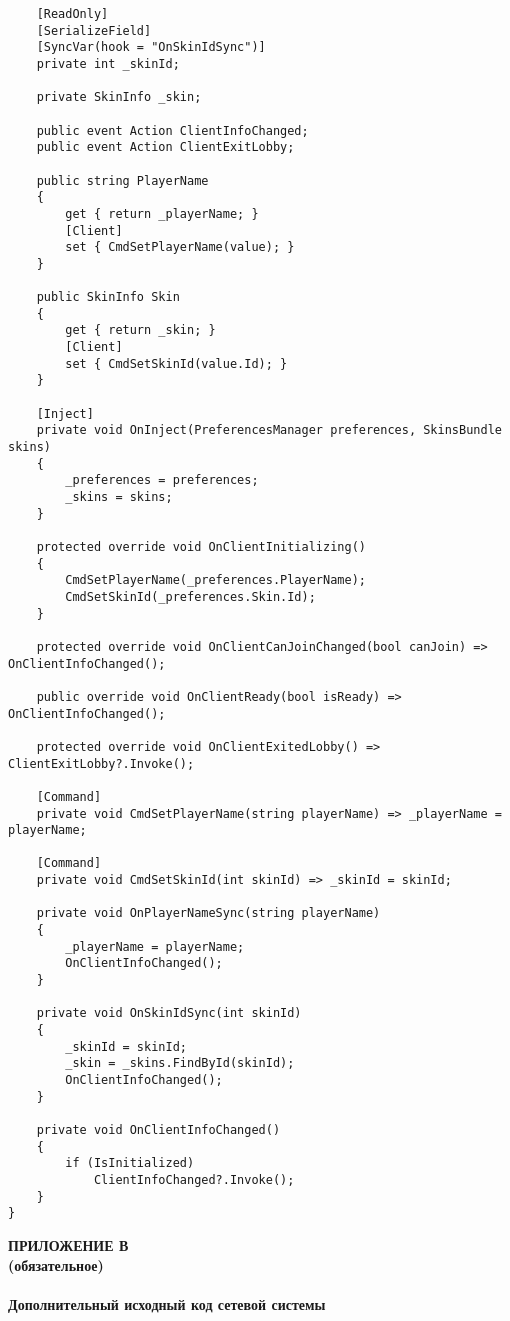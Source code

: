 \begin{lstlisting}
    [ReadOnly]
    [SerializeField]
    [SyncVar(hook = "OnSkinIdSync")]
    private int _skinId;

    private SkinInfo _skin;

    public event Action ClientInfoChanged;
    public event Action ClientExitLobby;

    public string PlayerName
    {
        get { return _playerName; }
        [Client]
        set { CmdSetPlayerName(value); }
    }

    public SkinInfo Skin
    {
        get { return _skin; }
        [Client]
        set { CmdSetSkinId(value.Id); }
    }

    [Inject]
    private void OnInject(PreferencesManager preferences, SkinsBundle skins)
    {
        _preferences = preferences;
        _skins = skins;
    }

    protected override void OnClientInitializing()
    {
        CmdSetPlayerName(_preferences.PlayerName);
        CmdSetSkinId(_preferences.Skin.Id);
    }

    protected override void OnClientCanJoinChanged(bool canJoin) => OnClientInfoChanged();

    public override void OnClientReady(bool isReady) => OnClientInfoChanged();

    protected override void OnClientExitedLobby() => ClientExitLobby?.Invoke();

    [Command]
    private void CmdSetPlayerName(string playerName) => _playerName = playerName;

    [Command]
    private void CmdSetSkinId(int skinId) => _skinId = skinId;

    private void OnPlayerNameSync(string playerName)
    {
        _playerName = playerName;
        OnClientInfoChanged();
    }

    private void OnSkinIdSync(int skinId)
    {
        _skinId = skinId;
        _skin = _skins.FindById(skinId);
        OnClientInfoChanged();
    }

    private void OnClientInfoChanged()
    {
        if (IsInitialized)
            ClientInfoChanged?.Invoke();
    }
}
\end{lstlisting}


\newpage
{}
{}
\begin{center}
  \textbf{\MakeUppercase{Приложение В}\\
          (обязательное)\\~\\
          Дополнительный исходный код сетевой системы}
\end{center}


